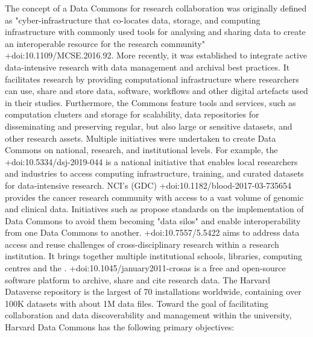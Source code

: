 \markdownRendererInterblockSeparator
{}The concept of a Data Commons for research collaboration was originally defined as "cyber-infrastructure that co-locates data, storage, and computing infrastructure with commonly used tools for analysing and sharing data to create an interoperable resource for the research community" +{}{}{doi:10.1109/MCSE.2016.92}. More recently, it was established to integrate active data-intensive research with data management and archival best practices. It facilitates research by providing computational infrastructure where researchers can use, share and store data, software, workflows and other digital artefacts used in their studies. Furthermore, the Commons feature tools and services, such as computation clusters and storage for scalability, data repositories for disseminating and preserving regular, but also large or sensitive datasets, and other research assets. Multiple initiatives were undertaken to create Data Commons on national, research, and institutional levels. For example, the  +{}{}{doi:10.5334/dsj-2019-044} is a national initiative that enables local researchers and industries to access computing infrastructure, training, and curated datasets for data-intensive research. NCI’s  (GDC) +{}{}{doi:10.1182/blood-2017-03-735654} provides the cancer research community with access to a vast volume of genomic and clinical data. Initiatives such as  propose standards on the implementation of Data Commons to avoid them becoming "data silos" and enable interoperability from one Data Commons to another.\markdownRendererInterblockSeparator
{} +{}{}{doi:10.7557/5.5422} aims to address data access and reuse challenges of cross-disciplinary research within a research institution. It brings together multiple institutional schools, libraries, computing centres and the .  +{}{}{doi:10.1045/january2011-crosas} is a free and open-source software platform to archive, share and cite research data. The Harvard Dataverse repository is the largest of 70 installations worldwide, containing over 100K datasets with about 1M data files. Toward the goal of facilitating collaboration and data discoverability and management within the university, Harvard Data Commons has the following primary objectives:\markdownRendererInterblockSeparator
